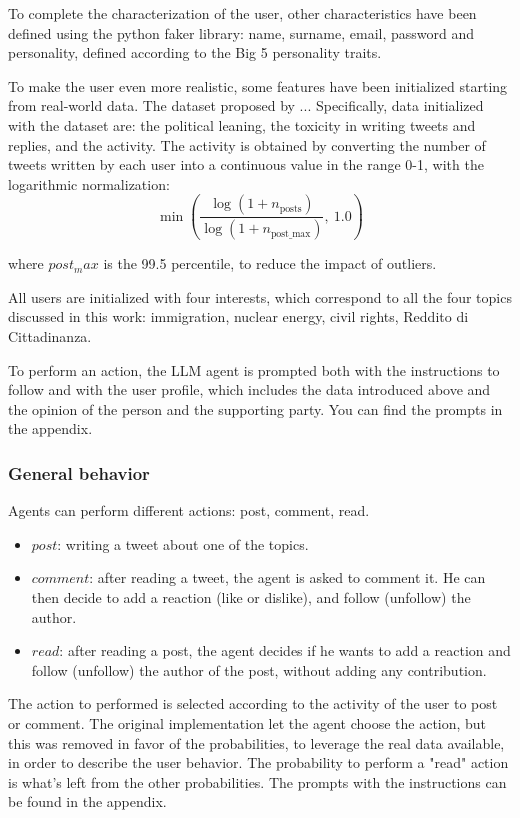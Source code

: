To complete the characterization of the user, other characteristics have been defined using the python faker library: name, surname, email, password and personality, defined according to the Big 5 personality traits.

To make the user even more realistic, some features have been initialized starting from real-world data. The dataset proposed by \citet{pierri2023ita} ... %
Specifically, data initialized with the dataset are: the political leaning, the toxicity in writing tweets and replies, and the activity.
The activity is obtained by converting the number of tweets written by each user into a continuous value in the range 0-1, with the logarithmic normalization:
\[
\min\left( \frac{\log(1 + n_{\text{posts}})}{\log(1 + n_{\text{post\_max}})},\ 1.0 \right)
\]

where $post_max$ is the 99.5 percentile, to reduce the impact of outliers.

All users are initialized with four interests, which correspond to all the four topics discussed in this work: immigration, nuclear energy, civil rights, Reddito di Cittadinanza.

To perform an action, the LLM agent is prompted both with the instructions to follow and with the user profile, which includes the data introduced above and the opinion of the person and the supporting party.
You can find the prompts in the appendix.



\subsubsection{General behavior}
Agents can perform different actions: post, comment, read.
\begin{itemize}
    \item $post$: writing a tweet about one of the topics.
    \item $comment$: after reading a tweet, the agent is asked to comment it. He can then decide to add a reaction (like or dislike), and follow (unfollow) the author.
    \item $read$: after reading a post, the agent decides if he wants to add a reaction and follow (unfollow) the author of the post, without adding any contribution.
\end{itemize}

The action to performed is selected according to the activity of the user to post or comment. 
The original implementation let the agent choose the action, but this was removed in favor of the probabilities, to leverage the real data available, in order to describe the user behavior.
The probability to perform a "read" action is what's left from the other probabilities.
The prompts with the instructions can be found in the appendix.


